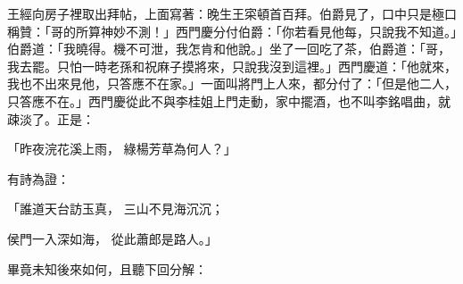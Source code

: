 王經向房子裡取出拜帖，上面寫著：晚生王寀頓首百拜。伯爵見了，口中只是極口稱贊：「哥的所算神妙不測！」西門慶分付伯爵：「你若看見他每，只說我不知道。」伯爵道：「我曉得。機不可泄，我怎肯和他說。」坐了一回吃了茶，伯爵道：「哥，我去罷。只怕一時老孫和祝麻子摸將來，只說我沒到這裡。」西門慶道：「他就來，我也不出來見他，只答應不在家。」一面叫將門上人來，都分付了：「但是他二人，只答應不在。」西門慶從此不與李桂姐上門走動，家中擺酒，也不叫李銘唱曲，就疎淡了。正是：

「昨夜浣花溪上雨，  綠楊芳草為何人？」

有詩為證：

「誰道天台訪玉真，  三山不見海沉沉；

侯門一入深如海，  從此蕭郎是路人。」

畢竟未知後來如何，且聽下回分解：


